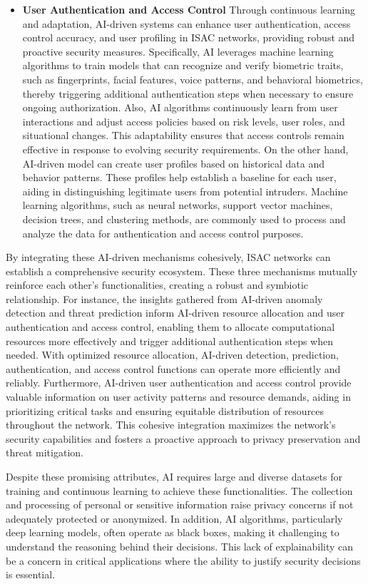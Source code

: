 \documentclass[10pt,journal,twocolumn,twoside]{IEEEtran} %
\begin{document}
\begin{itemize}
 \item {\bf User Authentication and Access Control} Through continuous learning and adaptation, AI-driven systems can enhance user authentication, access control accuracy, and user profiling in ISAC networks, providing robust and proactive security measures. Specifically, AI leverages machine learning algorithms to train models that can recognize and verify biometric traits, such as fingerprints, facial features, voice patterns, and behavioral biometrics, thereby triggering additional authentication steps when necessary to ensure ongoing authorization. Also, AI algorithms continuously learn from user interactions and adjust access policies based on risk levels, user roles, and situational changes. This adaptability ensures that access controls remain effective in response to evolving security requirements. On the other hand, AI-driven model can create user profiles based on historical data and behavior patterns. These profiles help establish a baseline for each user, aiding in distinguishing legitimate users from potential intruders. Machine learning algorithms, such as neural networks, support vector machines, decision trees, and clustering methods, are commonly used to process and analyze the data for authentication and access control purposes.
\end{itemize}
By integrating these AI-driven mechanisms cohesively, ISAC networks can establish a comprehensive security ecosystem. These three mechanisms mutually reinforce each other's functionalities, creating a robust and symbiotic relationship. For instance, the insights gathered from AI-driven anomaly detection and threat prediction inform AI-driven resource allocation and user authentication and access control, enabling them to allocate computational resources more effectively and trigger additional authentication steps when needed. With optimized resource allocation, AI-driven detection, prediction, authentication, and access control functions can operate more efficiently and reliably. Furthermore, AI-driven user authentication and access control provide valuable information on user activity patterns and resource demands, aiding in prioritizing critical tasks and ensuring equitable distribution of resources throughout the network. This cohesive integration maximizes the network's security capabilities and fosters a proactive approach to privacy preservation and threat mitigation.

Despite these promising attributes, AI requires large and diverse datasets for training and continuous learning to achieve these functionalities. The collection and processing of personal or sensitive information raise privacy concerns if not adequately protected or anonymized. In addition, AI algorithms, particularly deep learning models, often operate as black boxes, making it challenging to understand the reasoning behind their decisions. This lack of explainability can be a concern in critical applications where the ability to justify security decisions is essential.
\end{document}
